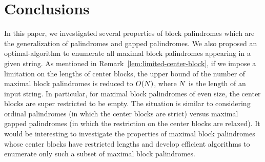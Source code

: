 \section{Conclusions}
In this paper, we investigated several properties of block palindromes which are the generalization of palindromes and gapped palindromes.
We also proposed an optimal-algorithm to enumerate all maximal block palindromes appearing in a given string.
As mentioned in Remark~\ref{lem:limited-center-block},
if we impose a limitation on the lengths of center blocks,
the upper bound of the number of maximal block palindromes is reduced to $O(N)$,
where $N$ is the length of an input string.
In particular, for maximal block palindromes of even size, the center blocks are super restricted to be empty.
The situation is similar to considering ordinal palindromes (in which the center blocks are strict)
versus maximal gapped palindromes (in which the restriction on the center blocks are relaxed).
It would be interesting to investigate the properties of maximal block palindromes whose center blocks have restricted lengths
and develop efficient algorithms to enumerate only such a subset of maximal block palindromes.
